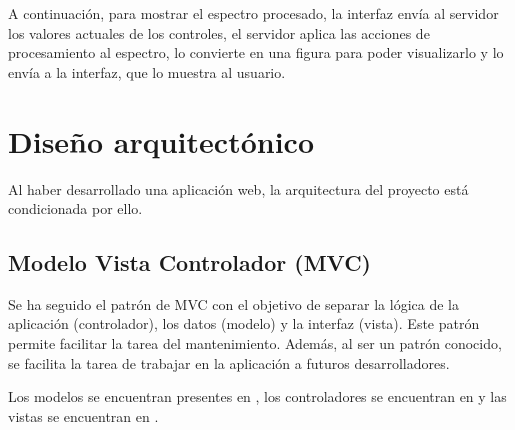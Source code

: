 A continuación, para mostrar el espectro procesado, la interfaz envía al 
servidor los valores actuales de los controles, el servidor aplica las acciones 
de procesamiento al espectro, lo convierte en una figura para poder 
visualizarlo y lo envía a la interfaz, que lo muestra al usuario.

\section{Diseño arquitectónico}

Al haber desarrollado una aplicación web, la arquitectura del proyecto está 
condicionada por ello.

\subsection{Modelo Vista Controlador (MVC)}

Se ha seguido el patrón de MVC con el objetivo de separar la lógica de la 
aplicación (controlador), los datos (modelo) y la interfaz (vista). Este patrón 
permite facilitar la tarea del mantenimiento. Además, al ser un patrón 
conocido, se facilita la tarea de trabajar en la aplicación a futuros 
desarrolladores. 


Los modelos se encuentran presentes en , los 
controladores se encuentran en  y las vistas 
se encuentran en .
